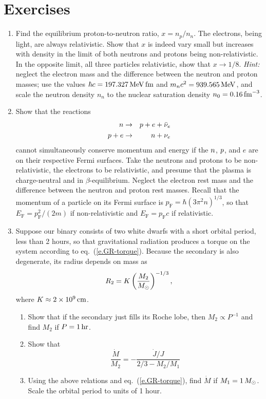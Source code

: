 \section{Exercises}
\begin{enumerate}
\item Find the equilibrium proton-to-neutron ratio, $x = n_{p}/n_{n}$.  The electrons, being light, are always relativistic.  Show that $x$ is indeed vary small but increases with density in the limit of both neutrons and protons being non-relativistic. In the opposite limit, all three particles relativistic, show that $x\to 1/8$.  \emph{Hint:} neglect the electron mass and the difference between the neutron and proton masses; use the values $\hbar c = 197.327\,\mathrm{M}\mathrm{eV}\,\mathrm{fm}$ and $m_{n}c^{2} = 939.565\,\mathrm{M}\mathrm{eV}$, and scale the neutron density $n_{n}$ to the nuclear saturation density $n_{0}= 0.16\,\mathrm{fm}^{-3}$.

\item Show that the reactions
\begin{eqnarray*}
n &\to& p + e + \bar{\nu}_{e}\\
p +e &\to& n + \nu_{e}
\end{eqnarray*}
cannot simultaneously conserve momentum and energy if the $n$, $p$, and $e$ are on their respective Fermi surfaces.  Take the neutrons and protons to be non-relativistic, the electrons to be relativistic, and presume that the plasma is charge-neutral and in $\beta$-equilibrium. Neglect the electron rest mass and the difference between the neutron and proton rest masses.  Recall that the momentum of a particle on its Fermi surface is $p_{\mathrm{F}} = \hbar(3\pi^{2} n)^{1/3}$, so that $E_{\mathrm{F}} = p_{\mathrm{F}}^{2}/(2m)$ if non-relativistic and $E_{\mathrm{F}} = p_{\mathrm{F}}c$ if relativistic.

\item Suppose our binary consists of two white dwarfs with a short orbital period, less than 2 hours, so that gravitational radiation produces a torque on the system according to eq.~(\ref{e.GR-torque}).  Because the secondary is also degenerate, its radius depends on mass as
\[ R_{2} = K \left(\frac{M_{2}}{M_\odot}\right)^{-1/3}, \]
where $K \approx 2\times 10^{9}\,\mathrm{c}\mathrm{m}$.
\begin{enumerate}
\item Show that if the secondary just fills its Roche lobe, then $M_{2} \propto P^{-1}$ and find $M_{2}$ if $P = 1\,\mathrm{hr}$.
\item Show that
\[ \frac{\dot{M}}{M_{2}} = - \frac{\dot{J}/J}{2/3 - M_{2}/M_{1}} \]
\item Using the above relations and eq.~(\ref{e.GR-torque}), find $\dot{M}$ if $M_{1} = 1\,M_\odot$. Scale the orbital period to units of 1 hour.
\end{enumerate}


\end{enumerate}
